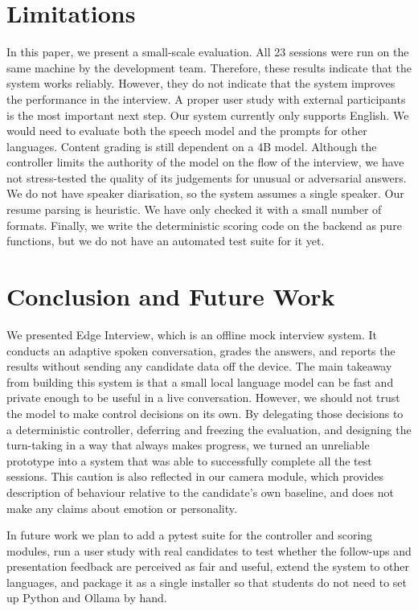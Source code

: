\documentclass[conference]{IEEEtran}
\begin{document}
\section{Limitations}\label{sec:limits}
In this paper, we present a small-scale evaluation. All 23 sessions were run on the same machine by the development team. Therefore, these results indicate that the system works reliably. However, they do not indicate that the system improves the performance in the interview. A proper user study with external participants is the most important next step. Our system currently only supports English. We would need to evaluate both the speech model and the prompts for other languages. Content grading is still dependent on a 4B model. Although the controller limits the authority of the model on the flow of the interview, we have not stress-tested the quality of its judgements for unusual or adversarial answers. We do not have speaker diarisation, so the system assumes a single speaker. Our resume parsing is heuristic. We have only checked it with a small number of formats. Finally, we write the deterministic scoring code on the backend as pure functions, but we do not have an automated test suite for it yet.

\section{Conclusion and Future Work}
We presented Edge Interview, which is an offline mock interview system. It conducts an adaptive spoken conversation, grades the answers, and reports the results without sending any candidate data off the device. The main takeaway from building this system is that a small local language model can be fast and private enough to be useful in a live conversation. However, we should not trust the model to make control decisions on its own. By delegating those decisions to a deterministic controller, deferring and freezing the evaluation, and designing the turn-taking in a way that always makes progress, we turned an unreliable prototype into a system that was able to successfully complete all the test sessions. This caution is also reflected in our camera module, which provides description of behaviour relative to the candidate's own baseline, and does not make any claims about emotion or personality.

In future work we plan to add a pytest suite for the controller and scoring modules, run a user study with real candidates to test whether the follow-ups and presentation feedback are perceived as fair and useful, extend the system to other languages, and package it as a single installer so that students do not need to set up Python and Ollama by hand.
\end{document}
